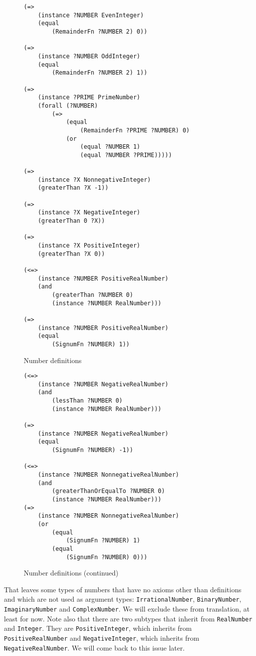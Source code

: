 \documentclass{article}
\begin{document}
\begin{figure}[H]
\begin{framed}
\begin{verbatim}
(=>
    (instance ?NUMBER EvenInteger)
    (equal
        (RemainderFn ?NUMBER 2) 0))

(=>
    (instance ?NUMBER OddInteger)
    (equal
        (RemainderFn ?NUMBER 2) 1))

(=>
    (instance ?PRIME PrimeNumber)
    (forall (?NUMBER)
        (=>
            (equal
                (RemainderFn ?PRIME ?NUMBER) 0)
            (or
                (equal ?NUMBER 1)
                (equal ?NUMBER ?PRIME)))))

(=>
    (instance ?X NonnegativeInteger)
    (greaterThan ?X -1))

(=>
    (instance ?X NegativeInteger)
    (greaterThan 0 ?X))

(=>
    (instance ?X PositiveInteger)
    (greaterThan ?X 0))

(<=>
    (instance ?NUMBER PositiveRealNumber)
    (and
        (greaterThan ?NUMBER 0)
        (instance ?NUMBER RealNumber)))	

(=>
    (instance ?NUMBER PositiveRealNumber)
    (equal
        (SignumFn ?NUMBER) 1))

\end{verbatim}
\end{framed}
\caption{Number definitions}
\label{fig:NumberDefs1}
\end{figure}

\begin{figure}[H]
\begin{framed}
\begin{verbatim}
(<=>
    (instance ?NUMBER NegativeRealNumber)
    (and
        (lessThan ?NUMBER 0)
        (instance ?NUMBER RealNumber)))	

(=>
    (instance ?NUMBER NegativeRealNumber)
    (equal
        (SignumFn ?NUMBER) -1))

(<=>
    (instance ?NUMBER NonnegativeRealNumber)
    (and
        (greaterThanOrEqualTo ?NUMBER 0)
        (instance ?NUMBER RealNumber)))		
(=>
    (instance ?NUMBER NonnegativeRealNumber)
    (or
        (equal
            (SignumFn ?NUMBER) 1)
        (equal
            (SignumFn ?NUMBER) 0)))
\end{verbatim}
\end{framed}
\caption{Number definitions (continued)}
\label{fig:NumberDefs2}
\end{figure}

That leaves some types of numbers that have no axioms other than definitions and
which are not used as argument types: \texttt{IrrationalNumber},
\texttt{BinaryNumber}, \texttt{ImaginaryNumber} and \texttt{ComplexNumber}.  We
will exclude these from translation, at least for now.  Note also that there are
two subtypes that inherit from \texttt{RealNumber} and \texttt{Integer}.  They are
\texttt{PositiveInteger}, which inherits from \texttt{PositiveRealNumber} and 
\texttt{NegativeInteger}, which inherits from \texttt{NegativeRealNumber}.  We will
come back to this issue later.
\end{document}
